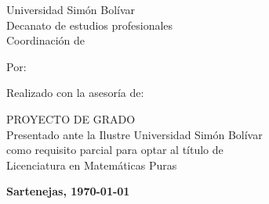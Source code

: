 \bgroup
\centering
\thispagestyle{empty}

\PrintUsbLogo
    {
        Universidad Simón Bolívar\\
        Decanato de estudios profesionales\\
        Coordinación de \coord
    }

\vspace{1.5cm}

\UppercaseBold{
    \wrapto[14cm][\centering]
    {\MainTitle}
}

\vspace{1.5cm}

Por:
\\
\autor

\vspace{1.5cm}

Realizado con la asesoría de:
\\
\tutor

\vspace{3cm}

\MakeUppercase{Proyecto de Grado}\\
Presentado ante la Ilustre Universidad Simón Bolívar\\
como requisito parcial para optar al título de\\
Licenciatura en Matemáticas Puras

\vspace{\fill}

\textbf{Sartenejas, \today}\par
\egroup
